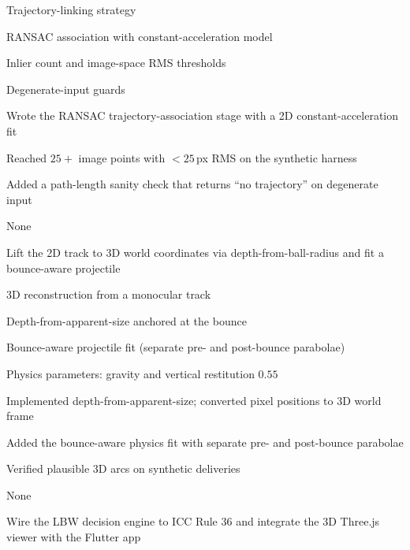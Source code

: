 \documentclass[12pt,a4paper]{report}
\begin{document}
%
{\begin{lblist}
\item Trajectory-linking strategy
\item RANSAC association with constant-acceleration model
\item Inlier count and image-space RMS thresholds
\item Degenerate-input guards
\end{lblist}}%
{\begin{lblist}
\item Wrote the RANSAC trajectory-association stage with a 2D constant-acceleration fit
\item Reached $25+$ image points with $<25$\,px RMS on the synthetic harness
\item Added a path-length sanity check that returns ``no trajectory'' on degenerate input
\end{lblist}}%
{\begin{lblist}\item None\end{lblist}}%
{\begin{lblist}\item Lift the 2D track to 3D world coordinates via depth-from-ball-radius and fit a bounce-aware projectile\end{lblist}}

%
{\begin{lblist}
\item 3D reconstruction from a monocular track
\item Depth-from-apparent-size anchored at the bounce
\item Bounce-aware projectile fit (separate pre- and post-bounce parabolae)
\item Physics parameters: gravity and vertical restitution $0.55$
\end{lblist}}%
{\begin{lblist}
\item Implemented depth-from-apparent-size; converted pixel positions to 3D world frame
\item Added the bounce-aware physics fit with separate pre- and post-bounce parabolae
\item Verified plausible 3D arcs on synthetic deliveries
\end{lblist}}%
{\begin{lblist}\item None\end{lblist}}%
{\begin{lblist}\item Wire the LBW decision engine to ICC Rule 36 and integrate the 3D Three.js viewer with the Flutter app\end{lblist}}
\end{document}
